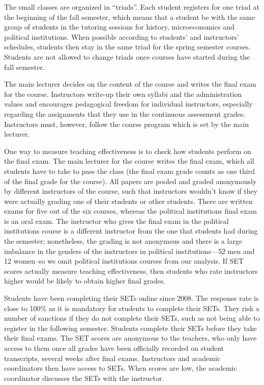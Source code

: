 \documentclass[12pt]{article}
\begin{document}
The small classes are organized in ``triads''. 
Each student registers for one triad at the beginning of the fall semester, 
which means that a student be with the same group of students in the tutoring sessions for history, microeconomics and 
political institutions. When possible according to students' and instructors' schedules, students then stay in the same triad
for the spring semester courses. Students are not allowed to change triads once courses have started during the fall semester. 

The main lecturer decides on the content of the course and writes the final exam for the course. Instructors write-up their 
own syllabi and the administration values and encourages pedagogical freedom for individual instructors, especially regarding 
the assignments that they use in the continuous assessment grades. Instructors must, however, follow the course program which
is set by the main lecturer. 

One way to measure teaching effectiveness is to check how students perform on the final exam. 
The main lecturer for the course writes the final exam, which all students have to take to pass the class 
(the final exam grade counts as one third of the final grade for the course). 
All papers are pooled and graded anonymously by different instructors of the course, such that instructors wouldn't know 
if they were actually grading one of their students or other students. There are written exams for five out of the six 
courses, whereas the political institutions final exam is an oral exam. 
The instructor who gives the final exam in the 
political institutions course is a different instructor from the one that students had during the semester;
nonetheless, the grading is not anonymous and there is a large imbalance in the genders of the
instructors in political institutions---52 men and 12 women--so we omit political institutions courses
from our analysis.
If SET scores actually measure teaching effectiveness, then students who rate instructors 
higher would be likely to obtain higher final grades. 

Students have been completing their SETs online since 2008. 
The response rate is close to 100\% as it is mandatory for 
students to complete their SETs. 
They risk a number of sanctions if they do not complete their SETs, such as not being able 
to register in the following semester. Students complete their SETs before they take their final exams. The SET scores are
anonymous to the teachers, who only have access to them once all grades have been officially recorded on student transcripts, 
several weeks after final exams. Instructors and academic coordinators then have access to SETs. When scores are low, the 
academic coordinator discusses the SETs with the instructor.   
\end{document}
